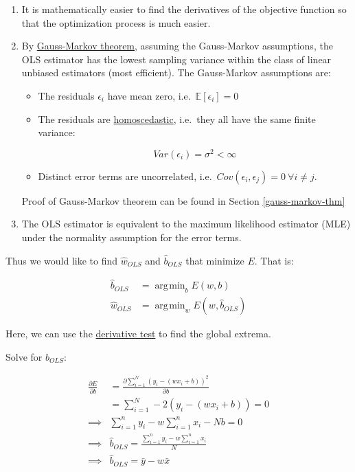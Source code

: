 \documentclass[12pt,a4paper]{article}
\DeclareMathOperator*{\argmin}{\arg\!\min}
\begin{document}
\begin{enumerate}
\def\labelenumi{\arabic{enumi}.}
\item
  It is mathematically easier to find the derivatives of the objective
  function so that the optimization process is much easier.
\item
  By
  \href{https://en.wikipedia.org/wiki/Gauss\%E2\%80\%93Markov_theorem}{Gauss-Markov
  theorem}, assuming the Gauss-Markov assumptions, the OLS estimator has
  the lowest sampling variance within the class of linear unbiased
  estimators (most efficient). The Gauss-Markov assumptions are:

  \begin{itemize}
  \item
    The residuals \(\epsilon_i\) have mean zero,
    i.e.~\(\mathbb{E}[\epsilon_i]=0\)
  \item
    The residuals are
    \href{https://en.wikipedia.org/wiki/Homoscedasticity}{homoscedastic},
    i.e.~they all have the same finite variance:

    \[Var(\epsilon_i)=\sigma^2<\infty\]
  \item
    Distinct error terms are uncorrelated,
    i.e.~\(Cov(\epsilon_i, \epsilon_j)=0\ \forall i\neq j\).
  \end{itemize}

  Proof of Gauss-Markov theorem can be found in Section \ref{gauss-markov-thm}
  
\item
  The OLS estimator is equivalent to the maximum likelihood estimator
  (MLE) under the normality assumption for the error terms.
\end{enumerate}

Thus we would like to find \(\hat w_{OLS}\) and \(\hat b_{OLS}\) that
minimize \(E\). That is:

\begin{align}
\hat b_{OLS} &= \argmin_b E(w,b)\\\hat w_{OLS}&=\argmin_w E(w,\hat b_{OLS})
\end{align}

Here, we can use the
\href{https://en.wikipedia.org/wiki/Derivative_test}{derivative test} to
find the global extrema.

Solve for \(\hat{b}_{OLS}\):

\begin{align}\frac{\partial E}{\partial b} &= \frac{\partial\sum^N_{i=1} (y_i-(wx_i+b))^2}{\partial b}\\&=\sum^N_{i=1}-2(y_i-(wx_i+b)) =0\\\implies& \sum^n_{i=1}y_i-w\sum^n_{i=1}x_i-Nb=0\\\implies&\hat b_{OLS} =\frac{\sum^n_{i=1}y_i-w\sum^n_{i=1}x_i}{N}\\\implies &\hat b_{OLS}=\bar{y}-w\bar{x}\end{align}
\end{document}
